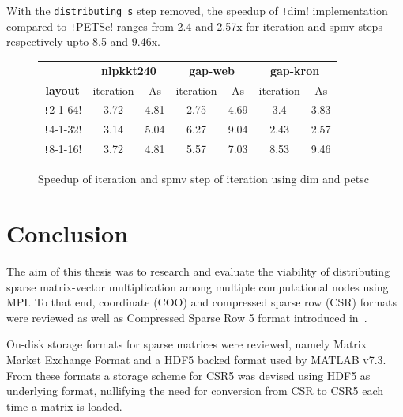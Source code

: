 \documentclass[thesis=M,english]{FITthesis}[2019/12/23]
\newcommand{\csre}[1]{\texttt!#1!}
\begin{document}
With the \texttt{distributing s} step removed, the speedup of \csre{dim} implementation compared to \csre{PETSc}
ranges from 2.4 and 2.57x for iteration and spmv steps respectively upto 8.5 and 9.46x.

\begin{figure}[htp]
    \centering
    \begin{tabular}{*{7}{c}}
        \toprule
                        & \multicolumn{2}{c}{\textbf{nlpkkt240}} & \multicolumn{2}{c}{\textbf{gap-web}} & \multicolumn{2}{c}{\textbf{gap-kron}}                           \\
        \cmidrule(lr){2-3} \cmidrule(lr){4-5} \cmidrule(lr){6-7}
        \textbf{layout} & iteration                              & As                                   & iteration                             & As   & iteration & As   \\
        \midrule
        \csre{2-1-64}   & 3.72                                   & 4.81                                 & 2.75                                  & 4.69 & 3.4       & 3.83 \\
        \csre{4-1-32}   & 3.14                                   & 5.04                                 & 6.27                                  & 9.04 & 2.43      & 2.57 \\
        \csre{8-1-16}   & 3.72                                   & 4.81                                 & 5.57                                  & 7.03 & 8.53      & 9.46 \\
        \bottomrule
    \end{tabular}
    \caption{Speedup of iteration and spmv step of iteration using dim and petsc}
\end{figure}


\chapter{Conclusion}

The aim of this thesis was to research and evaluate the viability of distributing sparse matrix-vector multiplication
among multiple computational nodes using MPI\@. To that end, coordinate (COO) and compressed sparse row (CSR) formats
were reviewed as well as Compressed Sparse Row 5 format introduced in~\cite{liu2015csr5}.

On-disk storage formats for sparse matrices were reviewed, namely Matrix Market Exchange Format
and a HDF5 backed format used by MATLAB v7.3. From these formats a storage scheme for CSR5 was devised
using HDF5 as underlying format, nullifying the need for conversion from CSR to CSR5 each time a matrix
is loaded.
\end{document}
